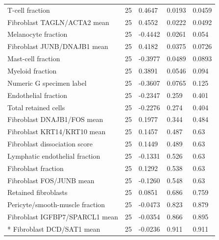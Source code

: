 \documentclass[10pt,a4paper]{article}
\begin{document}
{{\begin{longtable}{@{}p{76mm}p{20mm}p{25mm}p{22mm}p{22mm}@{}}
T-cell fraction & 25 & 0.4647 & 0.0193 & 0.0459 \\
Fibroblast TAGLN/ACTA2 mean & 25 & 0.4552 & 0.0222 & 0.0492 \\
Melanocyte fraction & 25 & -0.4442 & 0.0261 & 0.054 \\
Fibroblast JUNB/DNAJB1 mean & 25 & 0.4182 & 0.0375 & 0.0726 \\
Mast-cell fraction & 25 & -0.3977 & 0.0489 & 0.0893 \\
Myeloid fraction & 25 & 0.3891 & 0.0546 & 0.094 \\
Numeric G specimen label & 25 & -0.3607 & 0.0765 & 0.125 \\
Endothelial fraction & 25 & -0.2347 & 0.259 & 0.401 \\
Total retained cells & 25 & -0.2276 & 0.274 & 0.404 \\
Fibroblast DNAJB1/FOS mean & 25 & 0.1977 & 0.344 & 0.484 \\
Fibroblast KRT14/KRT10 mean & 25 & 0.1457 & 0.487 & 0.63 \\
Fibroblast dissociation score & 25 & 0.1449 & 0.489 & 0.63 \\
Lymphatic endothelial fraction & 25 & -0.1331 & 0.526 & 0.63 \\
Fibroblast fraction & 25 & 0.1292 & 0.538 & 0.63 \\
Fibroblast FOS/JUNB mean & 25 & -0.1260 & 0.548 & 0.63 \\
Retained fibroblasts & 25 & 0.0851 & 0.686 & 0.759 \\
Pericyte/smooth-muscle fraction & 25 & -0.0473 & 0.823 & 0.879 \\
Fibroblast IGFBP7/SPARCL1 mean & 25 & -0.0354 & 0.866 & 0.895 \\*
Fibroblast DCD/SAT1 mean & 25 & -0.0236 & 0.911 & 0.911 \\
\end{longtable}
}

}
\end{document}
